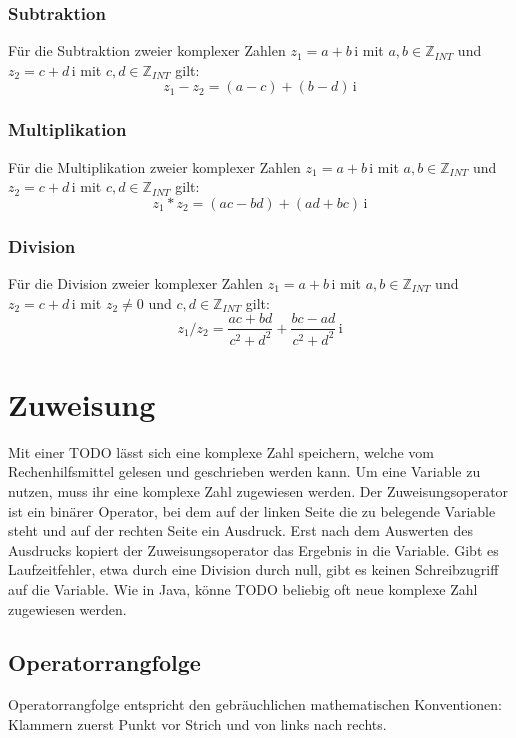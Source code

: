 \documentclass{sdqassignment}
\begin{document}
\subsubsection{Subtraktion \lstinlinetxt{-}}
Für die Subtraktion zweier komplexer Zahlen \(z_{1}=a+b\,\mathrm{i}\) mit \(a,b\in\mathbb{Z}_{INT}\) und \(z_{2}=c+d\,\mathrm{i}\) mit \(c,d\in\mathbb{Z}_{INT}\) gilt: \[z_{1}-z_{2}=(a-c)+(b-d)\,\mathrm{i}\]

\subsubsection{Multiplikation \lstinlinetxt{*}}
Für die Multiplikation zweier komplexer Zahlen \(z_{1}=a+b\,\mathrm{i}\) mit \(a,b\in\mathbb{Z}_{INT}\) und \(z_{2}=c+d\,\mathrm{i}\) mit \(c,d\in\mathbb{Z}_{INT}\) gilt: \[z_{1} * z_{2}=(ac-bd)+(ad+bc)\,\mathrm{i}\]

\subsubsection{Division \lstinlinetxt{/}}
Für die Division zweier komplexer Zahlen \(z_{1}=a+b\,\mathrm{i}\) mit \(a,b\in\mathbb{Z}_{INT}\) und \(z_{2}=c+d\,\mathrm{i}\) mit \(z_{2}\neq 0\) und \(c,d\in\mathbb{Z}_{INT}\) gilt: \[z_{1} / z_{2}=\frac{ac+bd}{c^{2}+d^{2}}+\frac{bc-ad}{c^{2}+d^{2}}\,\mathrm{i}\]

\section{Zuweisung \lstinlinetxt{=}}
Mit einer TODO lässt sich eine komplexe Zahl speichern, welche vom Rechenhilfsmittel gelesen und geschrieben werden kann. Um eine Variable zu nutzen, muss ihr eine komplexe Zahl zugewiesen werden. Der Zuweisungsoperator \lstinlinetxt{=} ist ein binärer Operator, bei dem auf der linken Seite die zu belegende Variable steht und auf der rechten Seite ein Ausdruck. Erst nach dem Auswerten des Ausdrucks kopiert der Zuweisungsoperator das Ergebnis in die Variable. Gibt es Laufzeitfehler, etwa durch eine Division durch null, gibt es keinen Schreibzugriff auf die Variable. Wie in Java, könne TODO beliebig oft neue komplexe Zahl zugewiesen werden. %



\subsection{Operatorrangfolge}
Operatorrangfolge entspricht den gebräuchlichen mathematischen Konventionen:
Klammern zuerst Punkt vor Strich und von links nach rechts.
\end{document}
